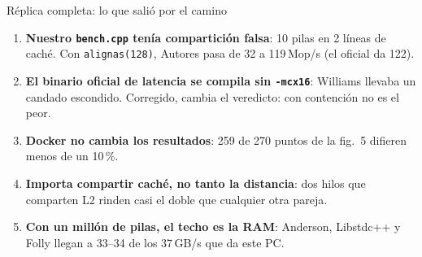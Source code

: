 \ifcorta\else
\begin{frame}{Réplica completa: lo que salió por el camino}
  \begin{enumerate}\small
    \item \textbf{Nuestro \texttt{bench.cpp} tenía compartición falsa}: 10 pilas en 2 líneas de caché. Con \texttt{alignas(128)}, Autores pasa de 32 a 119\,Mop/s (el oficial da 122).
    \item \textbf{El binario oficial de latencia se compila sin \texttt{-mcx16}}: Williams llevaba un candado escondido. Corregido, cambia el veredicto: con contención no es el peor.
    \item \textbf{Docker no cambia los resultados}: 259 de 270 puntos de la fig.~5 difieren menos de un 10\,\%.
    \item \textbf{Importa compartir caché, no tanto la distancia}: dos hilos que comparten L2 rinden casi el doble que cualquier otra pareja.
    \item \textbf{Con un millón de pilas, el techo es la RAM}: Anderson, Libstdc++ y Folly llegan a 33--34 de los 37\,GB/s que da este PC.
  \end{enumerate}
\end{frame}
\fi
